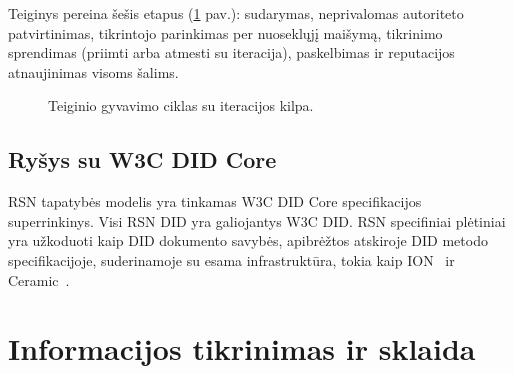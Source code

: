 \documentclass[11pt,a4paper,twocolumn]{article}
\begin{document}
Teiginys pereina šešis etapus (\ref{fig:lifecycle} pav.): sudarymas, neprivalomas autoriteto patvirtinimas, tikrintojo parinkimas per nuoseklųjį maišymą, tikrinimo sprendimas (priimti arba atmesti su iteracija), paskelbimas ir reputacijos atnaujinimas visoms šalims.

\begin{figure}[ht]
\centering
{}
\caption{Teiginio gyvavimo ciklas su iteracijos kilpa.}
\label{fig:lifecycle}
\end{figure}

\subsection{Ryšys su W3C DID Core}

RSN tapatybės modelis yra tinkamas W3C DID Core specifikacijos~\cite{did2022} superrinkinys. Visi RSN DID yra galiojantys W3C DID. RSN specifiniai plėtiniai yra užkoduoti kaip DID dokumento savybės, apibrėžtos atskiroje DID metodo specifikacijoje, suderinamoje su esama infrastruktūra, tokia kaip ION~\cite{buchner2021} ir Ceramic~\cite{ceramic2023}.

\section{Informacijos tikrinimas ir sklaida}
\end{document}
